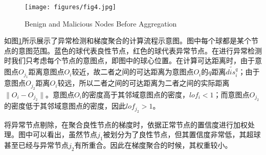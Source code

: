 \documentclass[lettersize,journal]{IEEEtran}
\begin{document}
\begin{figure}[!t]
    \centering
    \texttt{[image: figures/fig4.jpg]}
    \caption{Benign and Malicious Nodes Before Aggregation}
    \label{fig:before-agg}
\end{figure}

如图\ref{fig:before-agg}所示展示了异常检测和梯度聚合的计算流程示意图。图中每个球都是某个节点的意图范围。蓝色的球代表良性节点，红色的球代表异常节点。在进行异常检测时我们只考虑每个节点的意图点，即图中的球心位置。在计算可达距离时，由于意图点$O_{j_1}$距离意图点$O_i$较近，故二者之间的可达距离为意图点$O_i$的$q$距离$\widetilde{dis_i^q}$；由于意图点$O_{j_2}$距离$O_i$较远，所以二者之间的可达距离为二者之间的实际距离$\|O_i-O_{j_2}\|$。意图点$O_i$的密度高于其邻域意图点的密度，$lof_i<1$；而意图点$O_{j_2}$的密度低于其邻域意图点的密度，因此$lof_{j_2} > 1$。

将异常节点剔除，在聚合良性节点的梯度时，依据正常节点的置信度进行加权处理。图中可以看出，虽然节点$j_1$被划分为了良性节点，但其置信度非常低，其超球甚至已经与异常节点$j_2$有所重合。因此在梯度聚合的时候，其权重较小。




\end{document}
